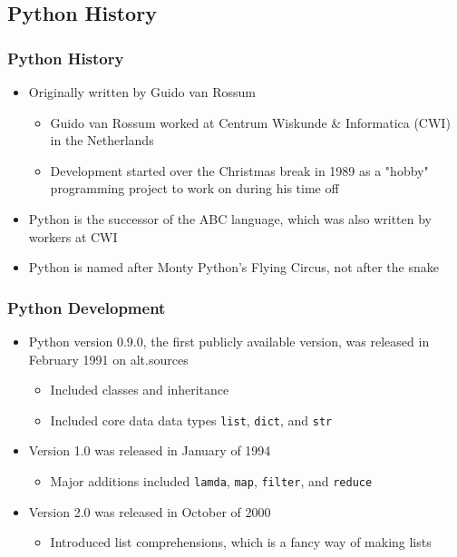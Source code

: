 \documentclass[mini frame in current subsection]{beamer}
\begin{document}
	\subsection{Python History}
	
		\begin{frame}
			\frametitle{Python History}
			\begin{itemize}
				\vfill \item  Originally written by Guido van Rossum
					\begin{itemize}
						\item  Guido van Rossum worked at Centrum Wiskunde \& Informatica (CWI) in the Netherlands
						\item Development started over the Christmas break in 1989 as a "hobby" programming project to work on during his time off
					\end{itemize}
				\vfill \item  Python is the successor of the ABC language, which was also written by workers at CWI
				\vfill \item  Python is named after Monty Python's Flying Circus, not after the snake
			\end{itemize}
		\end{frame}
	
		\begin{frame}
			\frametitle{Python Development}
			\begin{itemize}
				\vfill \item  Python version 0.9.0, the first publicly available version, was released in February 1991 on alt.sources
					\begin{itemize}
						\item  Included classes and inheritance
						\item  Included core data data types \texttt{list}, \texttt{dict}, and \texttt{str}
					\end{itemize}
				\vfill \item  Version 1.0 was released in January of 1994
					\begin{itemize}
						\item Major additions included \texttt{lamda}, \texttt{map}, \texttt{filter}, and \texttt{reduce}
					\end{itemize}
				\vfill \item  Version 2.0 was released in October of 2000
					\begin{itemize}
						\item  Introduced list comprehensions, which is a fancy way of making lists
					\end{itemize}
			\end{itemize}
		\end{frame}
	
\end{document}
